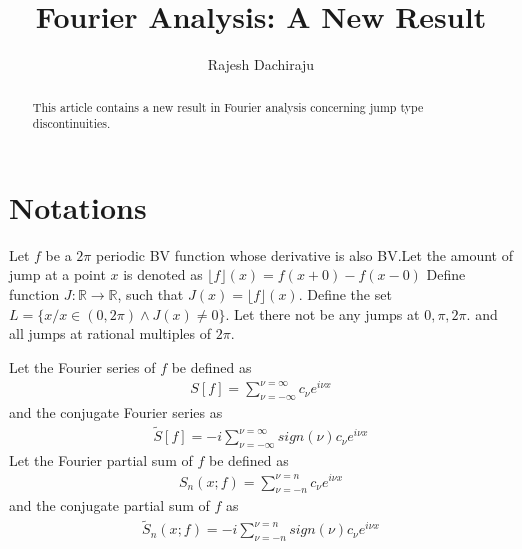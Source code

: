 \documentclass{amsart}
\theoremstyle{definition}
\theoremstyle{remark}
\numberwithin{equation}{section}
\begin{document}
\title{Fourier Analysis: A New Result}

\author{Rajesh Dachiraju}
\address{Independent Researcher, Hyderabad, India}





\begin{abstract}
This article contains a new result in Fourier analysis concerning jump type discontinuities.
\end{abstract}

\maketitle

\section{Notations}

Let $f$ be a $2\pi$ periodic BV function whose derivative is also BV.Let the amount of jump at a point $x$ is denoted as $\lfloor f \rfloor (x) = f(x+0)-f(x-0)$ Define function $J:\mathbb{R} \to\mathbb{R}$, such that $J(x) = \lfloor f \rfloor (x)$. Define the set $L = \{x/x\in(0,2\pi)\wedge J(x)\neq 0\}$. Let there not be any jumps at $0, \pi, 2\pi$. and all jumps at rational multiples of $2\pi$.

Let the Fourier series of $f$ be defined as 
\begin{equation}\begin{aligned}
S[f] =  \sum_{\nu=-\infty}^{\nu=\infty}c_{\nu}e^{i\nu x}
\end{aligned}\end{equation}
and the conjugate Fourier series as
\begin{equation}\begin{aligned}
\tilde{S}[f] =  -i\sum_{\nu=-\infty}^{\nu=\infty}sign(\nu)c_{\nu}e^{i\nu x}
\end{aligned}\end{equation}
Let the Fourier partial sum of $f$ be defined as
\begin{equation}\begin{aligned}
S_n(x;f) = \sum_{\nu=-n}^{\nu=n}c_{\nu}e^{i\nu x}
\end{aligned}\end{equation}
and the conjugate partial sum of $f$ as 
\begin{equation}\begin{aligned}
\tilde{S}_n(x;f) = -i\sum_{\nu=-n}^{\nu=n}sign(\nu)c_{\nu}e^{i\nu x}
\end{aligned}\end{equation}
\end{document}
